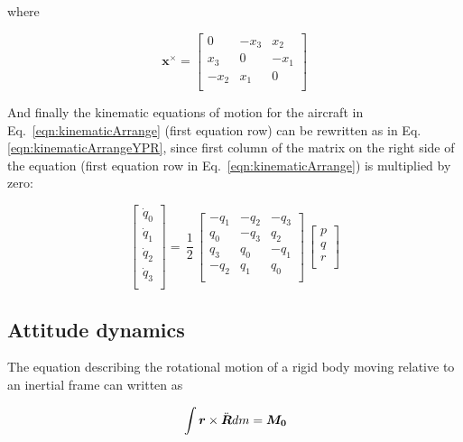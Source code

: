 where

\begin{equation}\label{skew_symmetric}
\bm{x} ^ \times= \begin{bmatrix} 
0 & -x_3 & x_2 \\
x_3 & 0 & -x_1 \\
-x_2 & x_1 & 0 \\
 \end{bmatrix}
\end{equation}

And finally the kinematic equations of motion for the aircraft in Eq.~\ref{eqn:kinematicArrange} (first equation row) can be rewritten as in Eq. \ref{eqn:kinematicArrangeYPR}, since first column of the matrix on the right side of the equation (first equation row in Eq.~\ref{eqn:kinematicArrange}) is multiplied by zero: 

\begin{equation} \label{eqn:kinematicArrangeYPR}
\begin{bmatrix}
\dot{q}_0\\[0.2em]
\dot{q}_1\\[0.2em]
\dot{q}_2\\[0.2em]
\dot{q}_3\\[0.2em]
\end{bmatrix}
 =\,
\frac{1}{2}
\,
\begin{bmatrix}
-q_1 & -q_2 & -q_3 \\
q_0 & -q_3 & q_2 \\
q_3 & q_0 & -q_1 \\
-q_2 & q_1 & q_0\\
\end{bmatrix}
\,
\begin{bmatrix}
p\\[0.2em]
q\\[0.2em]
r\\[0.2em]
\end{bmatrix} 
\end{equation}

\subsection{Attitude dynamics}

The equation describing the rotational motion of a rigid body moving relative to an inertial frame can written as \cite{wie2008space}

\begin{equation}{\label{eqn:kinematicEquDQM}}
\int \bm{r} \times \ddot{\bm{R}} dm = \bm{M_0}
\end{equation}

